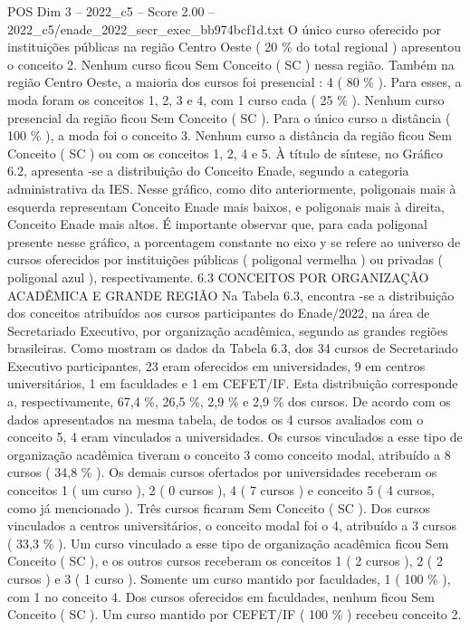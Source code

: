 \begin{textsample}{POS Dim 3 – 2022\_c5 – Score 2.00 – 2022\_c5/enade\_2022\_secr\_exec\_bb974bcf1d.txt}
O único curso oferecido por instituições públicas na região Centro Oeste ( 20 \% do total regional ) apresentou o conceito 2.
Nenhum curso ficou Sem Conceito ( SC ) nessa região.
Também na região Centro Oeste, a maioria dos cursos foi presencial : 4 ( 80 \% ).
Para esses, a moda foram os conceitos 1, 2, 3 e 4, com 1 curso cada ( 25 \% ).
Nenhum curso presencial da região ficou Sem Conceito ( SC ).
Para o único curso a distância ( 100 \% ), a moda foi o conceito 3.
Nenhum curso a distância da região ficou Sem Conceito ( SC ) ou com os conceitos 1, 2, 4 e 5.
À título de síntese, no Gráfico 6.2, apresenta -se a distribuição do Conceito Enade, segundo a categoria administrativa da IES.
Nesse gráfico, como dito anteriormente, poligonais mais à esquerda representam Conceito Enade mais baixos, e poligonais mais à direita, Conceito Enade mais altos.
É importante observar que, para cada poligonal presente nesse gráfico, a porcentagem constante no eixo y se refere ao universo de cursos oferecidos por instituições públicas ( poligonal vermelha ) ou privadas ( poligonal azul ), respectivamente. 6.3 CONCEITOS POR ORGANIZAÇÃO ACADÊMICA E GRANDE REGIÃO Na Tabela 6.3, encontra -se a distribuição dos conceitos atribuídos aos cursos participantes do Enade/2022, na área de Secretariado Executivo, por organização acadêmica, segundo as grandes regiões brasileiras.
Como mostram os dados da Tabela 6.3, dos 34 cursos de Secretariado Executivo participantes, 23 eram oferecidos em universidades, 9 em centros universitários, 1 em faculdades e 1 em CEFET/IF.
Esta distribuição corresponde a, respectivamente, 67,4 \%, 26,5 \%, 2,9 \% e 2,9 \% dos cursos.
De acordo com os dados apresentados na mesma tabela, de todos os 4 cursos avaliados com o conceito 5, 4 eram vinculados a universidades.
Os cursos vinculados a esse tipo de organização acadêmica tiveram o conceito 3 como conceito modal, atribuído a 8 cursos ( 34,8 \% ).
Os demais cursos ofertados por universidades receberam os conceitos 1 ( um curso ), 2 ( 0 cursos ), 4 ( 7 cursos ) e conceito 5 ( 4 cursos, como já mencionado ).
Três cursos ficaram Sem Conceito ( SC ).
Dos cursos vinculados a centros universitários, o conceito modal foi o 4, atribuído a 3 cursos ( 33,3 \% ).
Um curso vinculado a esse tipo de organização acadêmica ficou Sem Conceito ( SC ), e os outros cursos receberam os conceitos 1 ( 2 cursos ), 2 ( 2 cursos ) e 3 ( 1 curso ).
Somente um curso mantido por faculdades, 1 ( 100 \% ), com 1 no conceito 4.
Dos cursos oferecidos em faculdades, nenhum ficou Sem Conceito ( SC ).
Um curso mantido por CEFET/IF ( 100 \% ) recebeu conceito 2.

\end{textsample}

